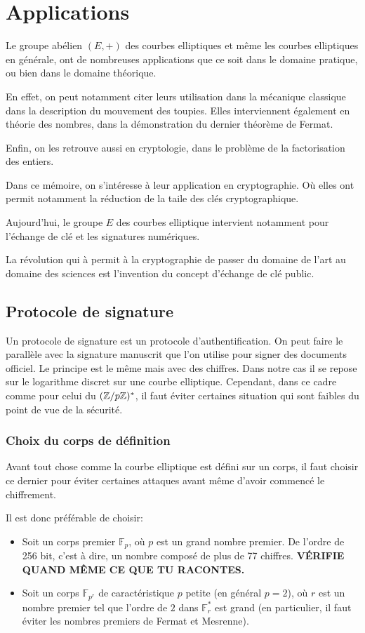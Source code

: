 \chapter{Applications}
Le groupe abélien $(E,+)$ des courbes elliptiques et même les courbes elliptiques en générale,
ont de nombreuses applications que ce soit dans le domaine pratique, ou bien dans le domaine
théorique.

En effet, on peut notamment citer leurs utilisation dans la mécanique classique dans la
description du mouvement des toupies. Elles interviennent également en théorie des nombres, dans la démonstration
du dernier théorème de Fermat.

Enfin, on les retrouve aussi en cryptologie, dans le problème de la factorisation des entiers.

Dans ce mémoire, on s'intéresse à leur application en cryptographie. Où elles ont
permit notamment la réduction de la taile des clés cryptographique.

Aujourd'hui, le groupe $E$ des courbes elliptique intervient notamment pour l'échange de clé
et les signatures numériques.

La révolution qui à permit à la cryptographie de passer du domaine de l'art au domaine des
sciences est l'invention du concept d'échange de clé public. 

\section{Protocole de signature}

Un protocole de signature est un protocole d'authentification. On peut faire le parallèle avec
la signature manuscrit que l'on utilise pour signer des documents officiel. Le principe est le
même mais avec des chiffres. Dans notre cas il se repose sur le logarithme discret sur une
courbe elliptique. Cependant, dans ce cadre comme pour celui du $(\mathbb{Z} / p\mathbb{Z})^*$, il faut éviter
certaines situation qui sont faibles du point de vue de la sécurité.

\subsection{Choix du corps de définition}
Avant tout chose comme la courbe elliptique est défini sur un corps, il faut choisir ce dernier
pour éviter certaines attaques avant même d'avoir commencé le chiffrement.

Il est donc préférable de choisir:
\begin{itemize}
    \item Soit un corps premier $\mathbb{F}_{p}$, où $p$ est un grand nombre premier. De
        l'ordre de 256 bit, c'est à dire, un nombre composé de plus de 77 chiffres.
        \textbf{VÉRIFIE QUAND MÊME CE QUE TU RACONTES.}
    \item Soit un corps $\mathbb{F}_{p^r}$ de caractéristique $p$ petite (en général $p = 2$),
        où $r$ est un nombre premier tel que l'ordre de $2$ dans $\mathbb{F}_{r}^*$ est grand
        (en particulier, il faut éviter les nombres premiers de Fermat et Mesrenne).
\end{itemize}

